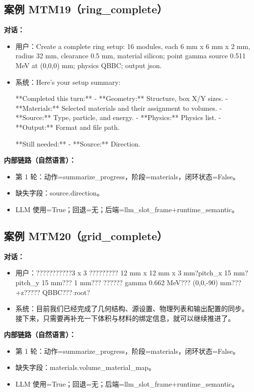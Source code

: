 \documentclass[11pt]{ctexart}
\begin{document}
\subsection{案例 MTM19（ring\_complete）}
\textbf{对话：}
\begin{itemize}
\item 用户：Create a complete ring setup: 16 modules, each 6 mm x 6 mm x 2 mm, radius 32 mm, clearance 0.5 mm, material silicon; point gamma source 0.511 MeV at (0,0,0) mm; physics QBBC; output json.
\item 系统：Here's your setup summary:

**Completed this turn:**
- **Geometry:** Structure, box X/Y sizes.
- **Materials:** Selected materials and their assignment to volumes.
- **Source:** Type, particle, and energy.
- **Physics:** Physics list.
- **Output:** Format and file path.

**Still needed:**
- **Source:** Direction.
\end{itemize}
\textbf{内部链路（自然语言）：}
\begin{itemize}
\item 第 1 轮：动作=summarize\_progress，阶段=materials，闭环状态=False。
\item 缺失字段：source.direction。
\item LLM 使用=True；回退=无；后端=llm\_slot\_frame+runtime\_semantic。
\end{itemize}
\subsection{案例 MTM20（grid\_complete）}
\textbf{对话：}
\begin{itemize}
\item 用户：???????????3 x 3 ????????? 12 mm x 12 mm x 3 mm?pitch\_x 15 mm?pitch\_y 15 mm??? 1 mm??? ?????? gamma 0.662 MeV??? (0,0,-90) mm??? +z????? QBBC??? root?
\item 系统：目前我们已经完成了几何结构、源设置、物理列表和输出配置的同步。接下来，只需要再补充一下体积与材料的绑定信息，就可以继续推进了。
\end{itemize}
\textbf{内部链路（自然语言）：}
\begin{itemize}
\item 第 1 轮：动作=summarize\_progress，阶段=materials，闭环状态=False。
\item 缺失字段：materials.volume\_material\_map。
\item LLM 使用=True；回退=无；后端=llm\_slot\_frame+runtime\_semantic。
\end{itemize}
\end{document}

